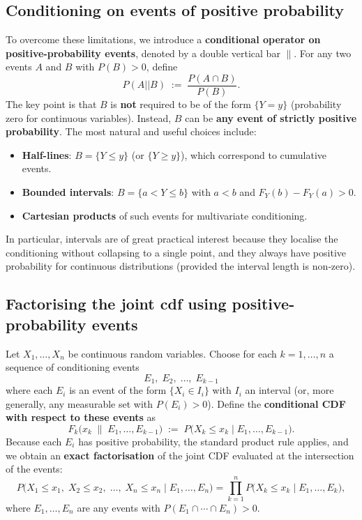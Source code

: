 \subsection{Conditioning on events of positive probability}

To overcome these limitations, we introduce a \textbf{conditional operator on positive-probability events}, denoted by a double vertical bar $\parallel$. For any two events $A$ and $B$ with $P(B) > 0$, define
\[
P(A || B) \;:=\; \frac{P(A \cap B)}{P(B)}.
\]
The key point is that $B$ is \textbf{not} required to be of the form $\{Y=y\}$ (probability zero for continuous variables). Instead, $B$ can be \textbf{any event of strictly positive probability}. The most natural and useful choices include:
\begin{itemize}
    \item \textbf{Half-lines}: $B = \{Y \le y\}$ (or $\{Y \ge y\}$), which correspond to cumulative events.
    \item \textbf{Bounded intervals}: $B = \{a < Y \le b\}$ with $a<b$ and $F_Y(b)-F_Y(a) > 0$.
    \item \textbf{Cartesian products} of such events for multivariate conditioning.
\end{itemize}
In particular, intervals are of great practical interest because they localise the conditioning without collapsing to a single point, and they always have positive probability for continuous distributions (provided the interval length is non‑zero).

\subsection{Factorising the joint cdf using positive-probability events}

Let $X_1,\dots,X_n$ be continuous random variables. Choose for each $k = 1,\dots,n$ a sequence of conditioning events
\[
E_1,\; E_2,\; \dots,\; E_{k-1}
\]
where each $E_i$ is an event of the form $\{X_i \in I_i\}$ with $I_i$ an interval (or, more generally, any measurable set with $P(E_i) > 0$). Define the \textbf{conditional CDF with respect to these events} as
\[
F_k\bigl(x_k \;\big\|\; E_1,\dots,E_{k-1}\bigr) \;:=\; P\bigl(X_k \le x_k \;\big|\; E_1,\dots,E_{k-1}\bigr).
\]
Because each $E_i$ has positive probability, the standard product rule applies, and we obtain an \textbf{exact factorisation} of the joint CDF evaluated at the intersection of the events:
\[
P\bigl(X_1 \le x_1,\; X_2 \le x_2,\; \dots,\; X_n \le x_n \;\big|\; E_1,\dots,E_n\bigr)
= \prod_{k=1}^{n} P\bigl(X_k \le x_k \;\big|\; E_1,\dots,E_k\bigr),
\]
where $E_1,\dots,E_n$ are any events with $P(E_1\cap\cdots\cap E_n) > 0$.

